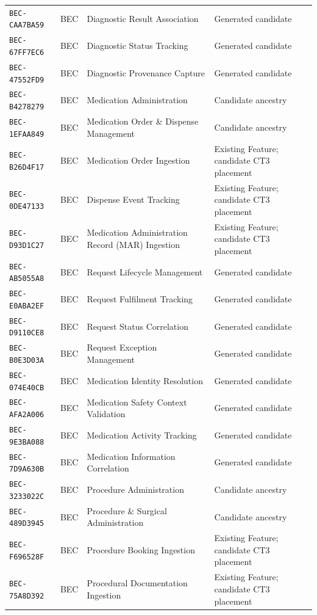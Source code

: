 \documentclass[11pt,a4paper,openany]{book}
\begin{document}
\begin{longtable}{@{}p{.19\linewidth}p{.12\linewidth}p{.39\linewidth}p{.24\linewidth}@{}}
\texttt{BEC-CAA7BA59} & BEC & Diagnostic Result Association & Generated candidate \\
\texttt{BEC-67FF7EC6} & BEC & Diagnostic Status Tracking & Generated candidate \\
\texttt{BEC-47552FD9} & BEC & Diagnostic Provenance Capture & Generated candidate \\
\texttt{BEC-B4278279} & BEC & Medication Administration & Candidate ancestry \\
\texttt{BEC-1EFAA849} & BEC & Medication Order \& Dispense Management & Candidate ancestry \\
\texttt{BEC-B26D4F17} & BEC & Medication Order Ingestion & Existing Feature; candidate CT3 placement \\
\texttt{BEC-0DE47133} & BEC & Dispense Event Tracking & Existing Feature; candidate CT3 placement \\
\texttt{BEC-D93D1C27} & BEC & Medication Administration Record (MAR) Ingestion & Existing Feature; candidate CT3 placement \\
\texttt{BEC-AB5055A8} & BEC & Request Lifecycle Management & Generated candidate \\
\texttt{BEC-E0ABA2EF} & BEC & Request Fulfilment Tracking & Generated candidate \\
\texttt{BEC-D9110CE8} & BEC & Request Status Correlation & Generated candidate \\
\texttt{BEC-B0E3D03A} & BEC & Request Exception Management & Generated candidate \\
\texttt{BEC-074E40CB} & BEC & Medication Identity Resolution & Generated candidate \\
\texttt{BEC-AFA2A006} & BEC & Medication Safety Context Validation & Generated candidate \\
\texttt{BEC-9E3BA088} & BEC & Medication Activity Tracking & Generated candidate \\
\texttt{BEC-7D9A630B} & BEC & Medication Information Correlation & Generated candidate \\
\texttt{BEC-3233022C} & BEC & Procedure Administration & Candidate ancestry \\
\texttt{BEC-489D3945} & BEC & Procedure \& Surgical Administration & Candidate ancestry \\
\texttt{BEC-F696528F} & BEC & Procedure Booking Ingestion & Existing Feature; candidate CT3 placement \\
\texttt{BEC-75A8D392} & BEC & Procedural Documentation Ingestion & Existing Feature; candidate CT3 placement \\

\end{longtable}
\end{document}

